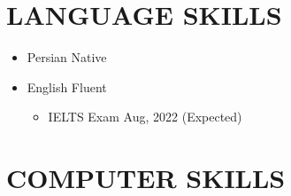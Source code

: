\documentclass[10pt,a4paper,sans]{moderncv} %
\begin{document}
	\vspace{-1em}
	
	\section{LANGUAGE SKILLS}
	\begin{itemize}[nosep]
	    \item Persian \hspace{5 pt} Native
        \item English \hspace{5 pt} Fluent
        \begin{itemize}[nosep]
            \item IELTS Exam \hfill Aug, 2022 (Expected)
        \end{itemize}
%		    
%		    
%		    
	\end{itemize}
	
	\vspace{-1em}
	
	\section{COMPUTER SKILLS}
	
\end{document}
